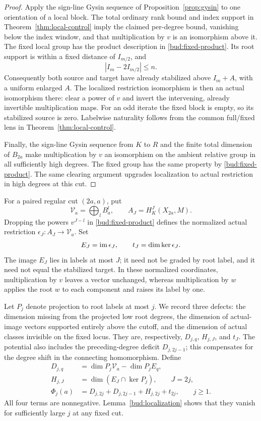 \begin{proof}
Apply the sign-line Gysin sequence of Proposition~\ref{prop:gysin} to
one orientation of a local block. The total ordinary rank bound and
index support in Theorem~\ref{thm:local-control} imply the claimed
per-degree bound, vanishing below the index window, and that multiplication
by $v$ is an isomorphism above it. The fixed local group has the product
description in \eqref{bud:fixed-product}. Its root support is within a
fixed distance of $I_{m/2}$, and
\[
 |I_m-2I_{m/2}|\le n.
\]
Consequently both source and target have already stabilized above
$I_m+A$, with a uniform enlarged $A$. The localized restriction
isomorphism is then an actual isomorphism there: clear a power of $v$
and invert the intervening, already invertible multiplication maps.
For an odd iterate the fixed block is empty, so its stabilized source
is zero. Labelwise naturality follows from the common full/fixed lens
in Theorem~\ref{thm:local-control}.

Finally, the sign-line Gysin sequence from $K$ to $R$ and the finite
total dimension of $B_{2a}$ make multiplication by $v$ an isomorphism
on the ambient relative group in all sufficiently high degrees.
The fixed group has the same property by \eqref{bud:fixed-product}.
The same clearing argument upgrades localization to actual restriction
in high degrees at this cut.
\end{proof}

For a paired regular cut $(2a,a)$, put
\[
 \mathcal V_a=\bigoplus_l B_a^l,\qquad
 A_J=H_K^J(X_{2a},M).
\]
Dropping the powers $v^{J-l}$ in \eqref{bud:fixed-product} defines the
normalized actual restriction
$\epsilon_J:A_J\to\mathcal V_a$. Set
\[
 E_J=\operatorname{im}\epsilon_J,\qquad t_J=\dim\ker\epsilon_J.
\]
The image $E_J$ lies in labels at most $J$; it need not be graded by
root label, and it need not equal the stabilized target. In these
normalized coordinates, multiplication by $v$ leaves a vector unchanged,
whereas multiplication by $w$ applies the root $w$ to each component and
raises its label by one.

Let $P_j$ denote projection to root labels at most $j$. We record three
defects: the dimension missing from the projected low root degrees,
the dimension of actual-image vectors supported entirely above the cutoff,
and the dimension of actual classes invisible on the fixed locus.
They are, respectively, $D_{j,q}$, $H_{j,J}$, and $t_J$.
The potential also includes the preceding-degree deficit $D_{j,2j-1}$;
this compensates for the degree shift in the connecting homomorphism.
Define
\begin{equation}\label{bud:potential}
 \begin{split}
 D_{j,q}&=\dim P_j\mathcal V_a-\dim P_jE_q,\\
 H_{j,J}&=\dim(E_J\cap\ker P_j),\qquad J=2j,\\
 \Phi_j(a)&=D_{j,2j}+D_{j,2j-1}+H_{j,2j}+t_{2j},
 \qquad j\ge1.
 \end{split}
\end{equation}
All four terms are nonnegative. Lemma~\ref{bud:localization} shows that
they vanish for sufficiently large $j$ at any fixed cut.

